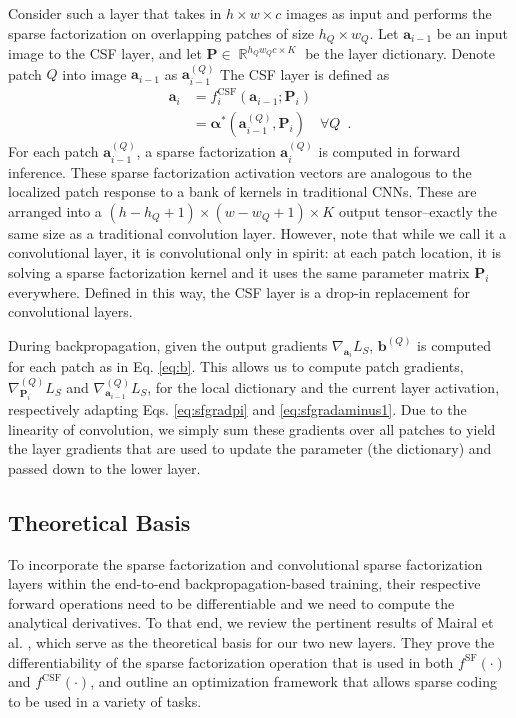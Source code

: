 \documentclass[10pt,twocolumn,letterpaper]{article}
\newcommand{\reals}{\mathop \mathbb{R}}
\renewcommand{\vec}{\mathbf}
\newcommand{\grad}[2]{\nabla_{\!\! #1} #2}
\newcommand{\gradpatch}[3]{\nabla_{\!\! #1}^{#2} #3}
\renewcommand{\P}{\vec{P}}
\renewcommand{\a}{\vec{a}}
\renewcommand{\b}{\vec{b}}
\newcommand{\balpha}{\boldsymbol{\alpha}}
\newcommand{\fSF}{^{\text{SF}}}
\newcommand{\fCSF}{^{\text{CSF}}}
\begin{document}
Consider such a layer that takes in $h\times w\times c$ images as input and performs the sparse factorization on overlapping patches of size $h_Q\times w_Q$. Let $\a_{i-1}$ be an input image to the CSF layer, and let $\P\in\reals^{h_Qw_Qc\times K}$ be the layer dictionary.  Denote patch $Q$ into image $\a_{i-1}$ as $\a_{i-1}^{(Q)}$ The CSF layer is defined as 
\begin{align}
    \a_i &= f_i\fCSF(\a_{i-1};\P_i) \\
         &= \balpha^*(\a_{i-1}^{(Q)},\P_i) \quad \forall Q \enspace.\nonumber
\end{align}
For each patch $\a_{i-1}^{(Q)}$, a sparse factorization $\a_i^{(Q)}$
is computed in forward inference.  These sparse factorization activation vectors are analogous to the localized patch response to a bank of kernels in traditional CNNs.  These are arranged into a $(h-h_Q+1)\times(w-w_Q+1)\times K$ output tensor--exactly the same size as a traditional convolution layer.  However, note that while we call it a convolutional layer, it is convolutional only in spirit: at each patch location, it is solving a sparse factorization kernel and it uses the same parameter matrix $\P_i$ everywhere.  Defined in this way, the CSF layer is a drop-in replacement for convolutional layers.



During backpropagation, given the output gradients $\grad{\a_{i}}{L_S}$, $\b^{(Q)}$ is computed for each patch as in Eq. \ref{eq:b}.  This allows us to compute patch gradients, $\gradpatch{\P_i}{(Q)}{L_S}$ and $\gradpatch{\a_{i-1}}{(Q)}{L_S}$, for the local dictionary and the current layer activation, respectively adapting Eqs. \ref{eq:sfgradpi} and \ref{eq:sfgradaminus1}.  Due to the linearity of convolution, we simply sum these gradients over all patches to yield the layer gradients that are used to update the parameter (the dictionary) and passed down to the lower layer.





\subsection{Theoretical Basis}
\label{sec:sparse:theory}



To incorporate the sparse factorization and convolutional sparse factorization layers within the end-to-end backpropagation-based training, their respective forward operations need to be differentiable and we need to compute the analytical derivatives.
To that end, we review the pertinent results of Mairal et al. \cite{MaBaPoTPAMI2012}, which serve as the theoretical basis for our two new layers.  They prove
the differentiability of the sparse factorization operation that is used in both $f\fSF(\cdot)$ and $f\fCSF(\cdot)$, and outline an optimization framework that allows sparse coding to be used in a variety of tasks. 
\end{document}

